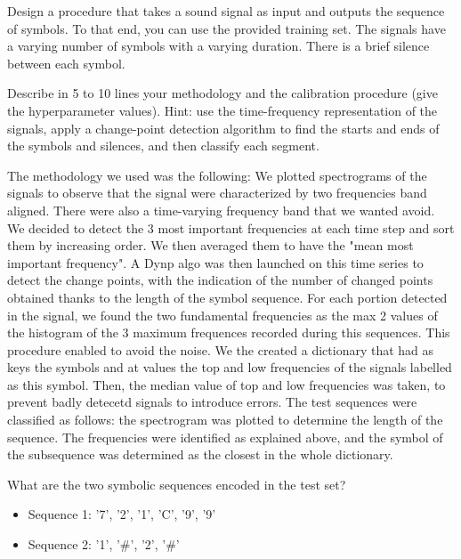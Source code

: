 \documentclass[11pt]{article}
\begin{document}
\begin{exercise}
Design a procedure that takes a sound signal as input and outputs the sequence of symbols. 
To that end, you can use the provided training set.
The signals have a varying number of symbols with a varying duration. 
There is a brief silence between each symbol.

Describe in 5 to 10 lines your methodology and the calibration procedure (give the hyperparameter values). Hint: use the time-frequency representation of the signals, apply a change-point detection algorithm to find the starts and ends of the symbols and silences, and then classify each segment. 

\end{exercise}
\begin{solution}
    The methodology we used was the following: 
    We plotted spectrograms of the signals to observe that the signal were characterized by two frequencies band aligned. 
    There were also a time-varying frequency band that we wanted avoid. 
    We decided to detect the 3 most important frequencies at each time step and sort them by increasing order. 
    We then averaged them to have the "mean most important frequency". 
    A Dynp algo was then launched on this time series to detect the change points, with the indication of the number of changed points obtained thanks to the length of the symbol sequence. 
    For each portion detected in the signal, we found the two fundamental frequencies as the max 2 values of the histogram of the 3 maximum frequences recorded during this sequences. 
    This procedure enabled to avoid the noise.
    We the created a dictionary that had as keys the symbols and at values the top and low frequencies of the signals labelled as this symbol.
    Then, the median value of top and low frequencies was taken, to prevent badly detecetd signals to introduce errors. 
    The test sequences were classified as follows: the spectrogram was plotted to determine the length of the sequence. 
    The frequencies were identified as explained above, and the symbol of the subsequence was determined as the closest in the whole dictionary. 

\end{solution}

\begin{exercise}
What are the two symbolic sequences encoded in the test set?
\end{exercise}

\begin{solution}
    \begin{itemize}
        \item Sequence 1: '7', '2', '1', 'C', '9', '9'
        \item Sequence 2: '1', '\#', '2', '\#' 
    \end{itemize}
\end{solution}
\end{document}
